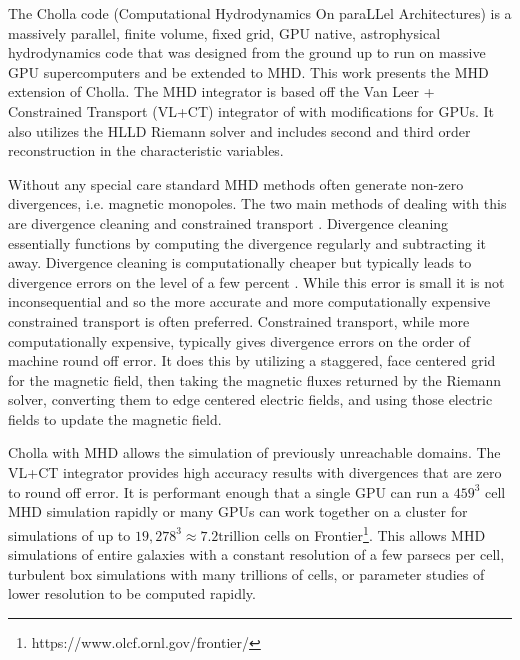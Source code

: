 The Cholla code (Computational Hydrodynamics On paraLLel Architectures)\citep{schneider_2015} is a massively parallel, finite volume, fixed grid, GPU native, astrophysical hydrodynamics code that was designed from the ground up to run on massive GPU supercomputers and be extended to MHD. This work presents the MHD extension of Cholla. The MHD integrator is based off the Van Leer + Constrained Transport (VL+CT) integrator of \cite{stone_2009} with modifications for GPUs. It also utilizes the HLLD Riemann solver and includes second and third order reconstruction in the characteristic variables.

Without any special care standard MHD methods often generate non-zero divergences, i.e. magnetic monopoles. The two main methods of dealing with this are divergence cleaning \citep{dedner_hyperbolic_2002} and constrained transport \citep{evans_1988}. Divergence cleaning essentially functions by computing the divergence regularly and subtracting it away. Divergence cleaning is computationally cheaper but typically leads to divergence errors on the level of a few percent \citep{pakmor_2020}. While this error is small it is not inconsequential and so the more accurate and more computationally expensive constrained transport is often preferred. Constrained transport, while more computationally expensive, typically gives divergence errors on the order of machine round off error\citep{evans_1988,stone_athena_2008, stone_2009}. It does this by utilizing a staggered, face centered grid for the magnetic field, then taking the magnetic fluxes returned by the Riemann solver, converting them to edge centered electric fields, and using those electric fields to update the magnetic field\citep{evans_1988,stone_athena_2008, stone_2009}.

Cholla with MHD allows the simulation of previously unreachable domains. The VL+CT integrator provides high accuracy results with divergences that are zero to round off error. It is performant enough that a single GPU can run a $459^3$ cell MHD simulation rapidly or many GPUs can work together on a cluster for simulations of up to $19,278^3 \approx 7.2 \text{trillion}$ cells on Frontier\footnote{https://www.olcf.ornl.gov/frontier/}. This allows MHD simulations of entire galaxies with a constant resolution of a few parsecs per cell, turbulent box simulations with many trillions of cells, or parameter studies of lower resolution to be computed rapidly.

